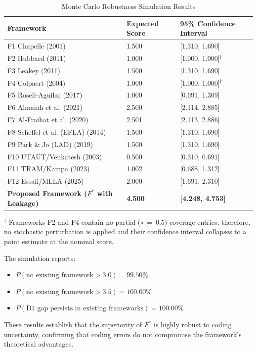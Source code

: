 \documentclass[11pt,a4paper]{article}
\newcommand{\partcov}{\textcolor{partcol}{\textbf{$\circ$}}}
\begin{document}
\begin{table}[ht]
  \caption{Monte Carlo Robustness Simulation Results}
  \label{tab:mc_results}
  \centering
  \renewcommand{\arraystretch}{1.3}
  \begin{tabular}{@{} L{7.5cm} C{2.5cm} C{4.0cm} @{} }
    \toprule
    \textbf{Framework} & \textbf{Expected Score} & \textbf{95\% Confidence Interval} \\
    \midrule
    F1 Chapelle (2001)~\cite{b1} & 1.500 & [1.310, 1.690] \\
    F2 Hubbard (2011)~\cite{b2} & 1.000 & [1.000, 1.000]$^{\dagger}$ \\
    F3 Leakey (2011)~\cite{b3} & 1.500 & [1.310, 1.690] \\
    F4 Colpaert (2004) & 1.000 & [1.000, 1.000]$^{\dagger}$ \\
    F5 Rosell-Aguilar (2017)~\cite{b5} & 1.000 & [0.691, 1.309] \\
    F6 Almaiah et al. (2021) & 2.500 & [2.114, 2.885] \\
    F7 Al-Fraihat et al. (2020)~\cite{b4} & 2.501 & [2.113, 2.886] \\
    F8 Scheffel et al. (EFLA) (2014)~\cite{b9} & 1.500 & [1.310, 1.690] \\
    F9 Park \& Jo (LAD) (2019)~\cite{b10} & 1.500 & [1.310, 1.690] \\
    F10 UTAUT/Venkatesh (2003) & 0.500 & [0.310, 0.691] \\
    F11 TRAM/Kampa (2023) & 1.002 & [0.688, 1.312] \\
    F12 Essafi/MLLA (2025) & 2.000 & [1.691, 2.310] \\
    \textbf{Proposed Framework ($F^*$ with Leakage)} & \textbf{4.500} & \textbf{[4.248, 4.753]} \\
    \bottomrule
  \end{tabular}
  \vskip 2pt
  \raggedright \scriptsize $^{\dagger}$ Frameworks F2 and F4 contain no partial (\partcov{}~=~0.5) coverage entries; therefore, no stochastic perturbation is applied and their confidence interval collapses to a point estimate at the nominal score.
\end{table}

The simulation reports:
\begin{itemize}
  \item $P(\text{no existing framework} > 3.0) = 99.50\%$
  \item $P(\text{no existing framework} > 3.5) = 100.00\%$
  \item $P(\text{D4 gap persists in existing frameworks}) = 100.00\%$
\end{itemize}
These results establish that the superiority of $F^*$ is highly robust to coding uncertainty, confirming that coding errors do not compromise the framework's theoretical advantages.
\end{document}

